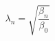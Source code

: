 \begin{center}
    \begin{equation}
        \lambda_n = \sqrt{\frac{\beta_{n}}{\beta_{0}}}
    \label{eq:lambda_scaling}     
    \end{equation}
\end{center}